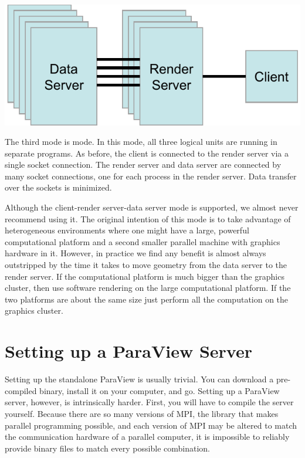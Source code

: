\begin{inlinefig}
  \includegraphics{images/RunModeClientRenderDataServer}
\end{inlinefig}

The third mode is  mode.  In this
mode, all three logical units are running in separate programs.  As before,
the client is connected to the render server via a single socket
connection.  The render server and data server are connected by many socket
connections, one for each process in the render server.  Data transfer over
the sockets is minimized.

Although the client-render server-data server mode is supported, we almost
never recommend using it.  The original intention of this mode is to take
advantage of heterogeneous environments where one might have a large,
powerful computational platform and a second smaller parallel machine with
graphics hardware in it.  However, in practice we find any benefit is
almost always outstripped by the time it takes to move geometry from the
data server to the render server.  If the computational platform is much
bigger than the graphics cluster, then use software rendering on the large
computational platform.  If the two platforms are about the same size just
perform all the computation on the graphics cluster.

\section{Setting up a ParaView Server}

Setting up the standalone ParaView is usually trivial.  You can download a
pre-compiled binary, install it on your computer, and go.  Setting up a
ParaView server, however, is intrinsically harder.  First, you will have to
compile the server yourself.  Because there are so many versions of MPI,
the library that makes parallel programming possible, and each version of
MPI may be altered to match the communication hardware of a parallel
computer, it is impossible to reliably provide binary files to match every
possible combination.


